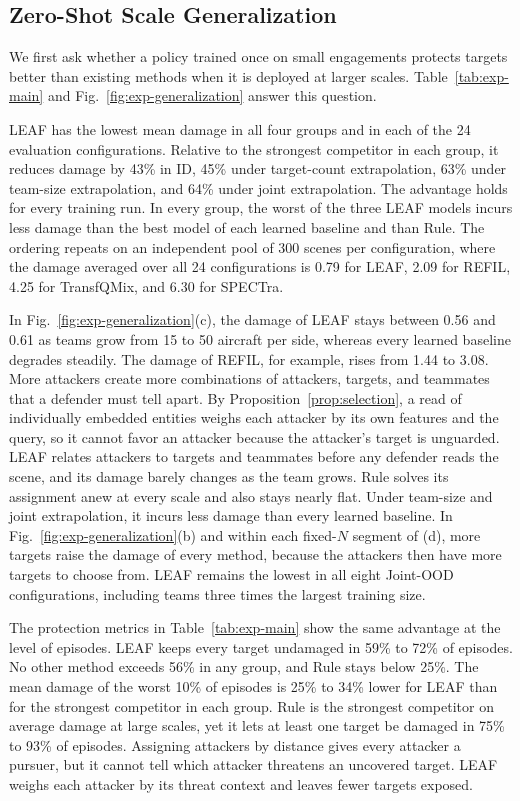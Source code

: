 \subsection{Zero-Shot Scale Generalization}
\label{subsec:exp-comparison}

We first ask whether a policy trained once on small engagements protects targets better than existing methods when it is deployed at larger scales. Table~\ref{tab:exp-main} and Fig.~\ref{fig:exp-generalization} answer this question.

LEAF has the lowest mean damage in all four groups and in each of the 24 evaluation configurations. Relative to the strongest competitor in each group, it reduces damage by 43\% in ID, 45\% under target-count extrapolation, 63\% under team-size extrapolation, and 64\% under joint extrapolation. The advantage holds for every training run. In every group, the worst of the three LEAF models incurs less damage than the best model of each learned baseline and than Rule. The ordering repeats on an independent pool of 300 scenes per configuration, where the damage averaged over all 24 configurations is 0.79 for LEAF, 2.09 for REFIL, 4.25 for TransfQMix, and 6.30 for SPECTra.

In Fig.~\ref{fig:exp-generalization}(c), the damage of LEAF stays between 0.56 and 0.61 as teams grow from 15 to 50 aircraft per side, whereas every learned baseline degrades steadily. The damage of REFIL, for example, rises from 1.44 to 3.08. More attackers create more combinations of attackers, targets, and teammates that a defender must tell apart. By Proposition~\ref{prop:selection}, a read of individually embedded entities weighs each attacker by its own features and the query, so it cannot favor an attacker because the attacker's target is unguarded. LEAF relates attackers to targets and teammates before any defender reads the scene, and its damage barely changes as the team grows. Rule solves its assignment anew at every scale and also stays nearly flat. Under team-size and joint extrapolation, it incurs less damage than every learned baseline. In Fig.~\ref{fig:exp-generalization}(b) and within each fixed-$N$ segment of (d), more targets raise the damage of every method, because the attackers then have more targets to choose from. LEAF remains the lowest in all eight Joint-OOD configurations, including teams three times the largest training size.

The protection metrics in Table~\ref{tab:exp-main} show the same advantage at the level of episodes. LEAF keeps every target undamaged in 59\% to 72\% of episodes. No other method exceeds 56\% in any group, and Rule stays below 25\%. The mean damage of the worst 10\% of episodes is 25\% to 34\% lower for LEAF than for the strongest competitor in each group. Rule is the strongest competitor on average damage at large scales, yet it lets at least one target be damaged in 75\% to 93\% of episodes. Assigning attackers by distance gives every attacker a pursuer, but it cannot tell which attacker threatens an uncovered target. LEAF weighs each attacker by its threat context and leaves fewer targets exposed.

